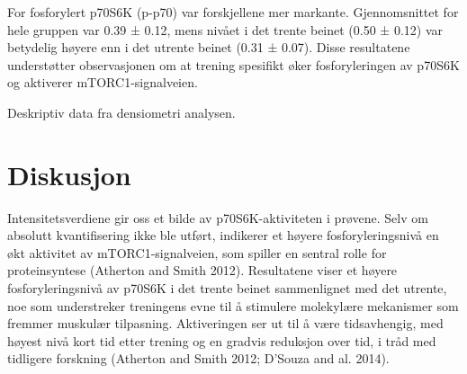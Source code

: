 \documentclass[
  letterpaper,
  DIV=11,
  numbers=noendperiod]{scrreprt}
\begin{document}
For fosforylert p70S6K (p-p70) var forskjellene mer markante.
Gjennomsnittet for hele gruppen var 0.39 ± 0.12, mens nivået i det
trente beinet (0.50 ± 0.12) var betydelig høyere enn i det utrente
beinet (0.31 ± 0.07). Disse resultatene understøtter observasjonen om at
trening spesifikt øker fosforyleringen av p70S6K og aktiverer
mTORC1-signalveien.

\begin{table}

\caption{\label{tbl-resultater}Deskriptiv data fra densiometri
analysen.}


\end{table}%

\section{Diskusjon}\label{diskusjon-4}

Intensitetsverdiene gir oss et bilde av p70S6K-aktiviteten i prøvene.
Selv om absolutt kvantifisering ikke ble utført, indikerer et høyere
fosforyleringsnivå en økt aktivitet av mTORC1-signalveien, som spiller
en sentral rolle for proteinsyntese (Atherton and Smith 2012).
Resultatene viser et høyere fosforyleringsnivå av p70S6K i det trente
beinet sammenlignet med det utrente, noe som understreker treningens
evne til å stimulere molekylære mekanismer som fremmer muskulær
tilpasning. Aktiveringen ser ut til å være tidsavhengig, med høyest nivå
kort tid etter trening og en gradvis reduksjon over tid, i tråd med
tidligere forskning (Atherton and Smith 2012; D'Souza and al. 2014).
\end{document}
